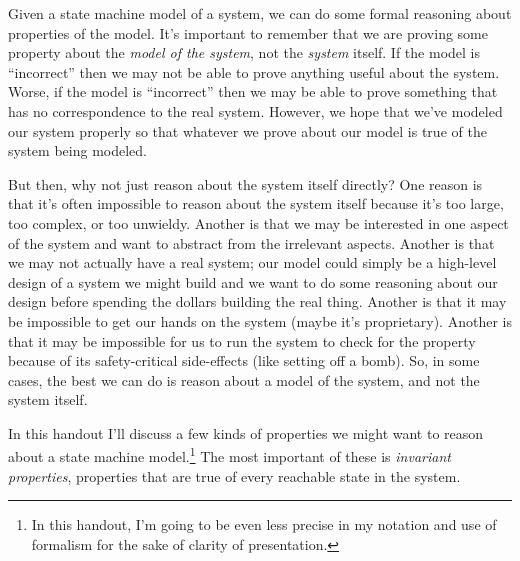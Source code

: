 


\newtheorem{defn}{Definition}
\newenvironment{spec}{
 \vspace*{8pt}
 \begin{center}
 \begin{minipage}{5in}
 \renewcommand{\baselinestretch}{1}
 }{
 \end{minipage}
 \end{center}
 \vspace*{8pt}
}



\begin{symbolfootnotes}
\end{symbolfootnotes}

Given a state machine model of a system, we can do some formal
reasoning about properties of the model.
It's important to remember
that we are proving some property about the {\em model of the system},
not the {\em system} itself.
If the model is ``incorrect'' then we may not be able to prove
anything useful about the system.
Worse, if the model is ``incorrect'' then we may
be able to prove something
that has no correspondence to the real system.  However, we
hope that we've modeled our system properly so that whatever we prove
about our model is true of the system being modeled.

But then, why not just reason about the system itself directly?
One reason is that it's often impossible to reason about the system
itself because it's too large, too complex, or too unwieldy.
Another is that we may be interested in one aspect of the
system
and want to abstract from the irrelevant aspects.
Another is that we may not actually have a real system; our model
could simply be a high-level design of a system we might build
and we want to do some reasoning about our design before
spending the dollars building the real thing.
Another is that it may be impossible to get our hands on the system
(maybe it's proprietary).  Another is that it may be impossible
for us to run the system to check for the property because
of its safety-critical side-effects (like setting off a bomb).
So, in some cases, the best we can do is reason about a model of the
system,
and not the system itself.

In this handout I'll discuss a few kinds of properties we might
want to reason about a state machine model.\footnote{
In this handout, I'm going to be even less precise in my notation
and use of formalism
for the sake of clarity of presentation.}   The most important
of these is {\em invariant properties}, properties that are
true of every reachable state in the system.

